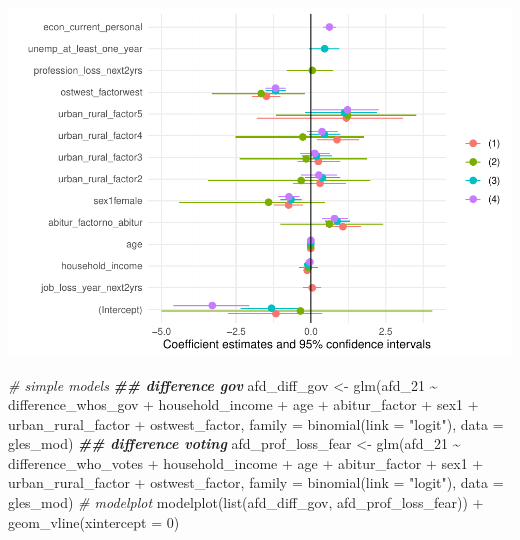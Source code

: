 \documentclass[
]{article}
\newenvironment{Shaded}{\begin{snugshade}}{\end{snugshade}}
\newcommand{\AttributeTok}[1]{\textcolor[rgb]{0.77,0.63,0.00}{#1}}
\newcommand{\CommentTok}[1]{\textcolor[rgb]{0.56,0.35,0.01}{\textit{#1}}}
\newcommand{\DecValTok}[1]{\textcolor[rgb]{0.00,0.00,0.81}{#1}}
\newcommand{\DocumentationTok}[1]{\textcolor[rgb]{0.56,0.35,0.01}{\textbf{\textit{#1}}}}
\newcommand{\FunctionTok}[1]{\textcolor[rgb]{0.00,0.00,0.00}{#1}}
\newcommand{\NormalTok}[1]{#1}
\newcommand{\OtherTok}[1]{\textcolor[rgb]{0.56,0.35,0.01}{#1}}
\newcommand{\SpecialCharTok}[1]{\textcolor[rgb]{0.00,0.00,0.00}{#1}}
\newcommand{\StringTok}[1]{\textcolor[rgb]{0.31,0.60,0.02}{#1}}
\begin{document}
\includegraphics{AVCD_Final_Assignment-Edenhofer_latest_files/figure-latex/simple-models-insecurity-1.pdf}

\begin{Shaded}
\begin{Highlighting}[]
\CommentTok{\# simple models }
\DocumentationTok{\#\# difference gov}
\NormalTok{afd\_diff\_gov }\OtherTok{\textless{}{-}} \FunctionTok{glm}\NormalTok{(afd\_21 }\SpecialCharTok{\textasciitilde{}}\NormalTok{ difference\_whos\_gov }\SpecialCharTok{+}\NormalTok{ household\_income }\SpecialCharTok{+}\NormalTok{ age }\SpecialCharTok{+}\NormalTok{ abitur\_factor }\SpecialCharTok{+}\NormalTok{ sex1 }\SpecialCharTok{+}\NormalTok{ urban\_rural\_factor }\SpecialCharTok{+}\NormalTok{ ostwest\_factor, }\AttributeTok{family =} \FunctionTok{binomial}\NormalTok{(}\AttributeTok{link =} \StringTok{"logit"}\NormalTok{), }
                         \AttributeTok{data =}\NormalTok{ gles\_mod)}
\DocumentationTok{\#\# difference voting }
\NormalTok{afd\_prof\_loss\_fear }\OtherTok{\textless{}{-}} \FunctionTok{glm}\NormalTok{(afd\_21 }\SpecialCharTok{\textasciitilde{}}\NormalTok{ difference\_who\_votes }\SpecialCharTok{+}\NormalTok{ household\_income }\SpecialCharTok{+}\NormalTok{ age }\SpecialCharTok{+}\NormalTok{ abitur\_factor }\SpecialCharTok{+}\NormalTok{ sex1 }\SpecialCharTok{+}\NormalTok{ urban\_rural\_factor }\SpecialCharTok{+}\NormalTok{ ostwest\_factor, }\AttributeTok{family =} \FunctionTok{binomial}\NormalTok{(}\AttributeTok{link =} \StringTok{"logit"}\NormalTok{), }
                         \AttributeTok{data =}\NormalTok{ gles\_mod)}
\CommentTok{\# modelplot}
\FunctionTok{modelplot}\NormalTok{(}\FunctionTok{list}\NormalTok{(afd\_diff\_gov, afd\_prof\_loss\_fear)) }\SpecialCharTok{+}
  \FunctionTok{geom\_vline}\NormalTok{(}\AttributeTok{xintercept =} \DecValTok{0}\NormalTok{)}
\end{Highlighting}
\end{Shaded}
\end{document}
